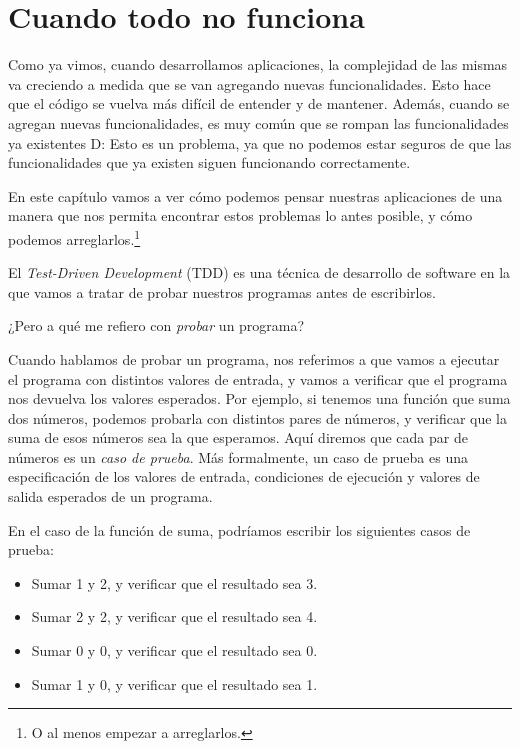 \chapter{Cuando todo no funciona}
  \label{chap:cuando-todo-no-funciona}

  Como ya vimos, cuando desarrollamos aplicaciones, la complejidad de las mismas va creciendo a 
  medida que se van agregando nuevas funcionalidades. 
  Esto hace que el código se vuelva más difícil de entender y de mantener. 
  Además, cuando se agregan nuevas funcionalidades, es muy común que se rompan las funcionalidades 
  ya existentes D: 
  Esto es un problema, ya que no podemos estar seguros de que las funcionalidades que ya existen 
  siguen funcionando correctamente.

  En este capítulo vamos a ver cómo podemos pensar nuestras aplicaciones de una manera que nos
  permita encontrar estos problemas lo antes posible, y cómo podemos arreglarlos.\footnote{
    O al menos empezar a arreglarlos.
  }

  El \textit{Test-Driven Development} (TDD) es una técnica de 
  desarrollo de software en la que vamos a tratar de probar nuestros programas antes de escribirlos.
  
  ¿Pero a qué me refiero con \textit{probar} un programa?

  Cuando hablamos de probar un programa, nos referimos a que vamos a ejecutar el programa con
  distintos valores de entrada, y vamos a verificar que el programa nos devuelva los valores
  esperados.
  Por ejemplo, si tenemos una función que suma dos números, podemos probarla con distintos pares
  de números, y verificar que la suma de esos números sea la que esperamos.
  Aquí diremos que cada par de números es un \textit{caso de prueba}.
  Más formalmente, un caso de prueba es una especificación de los valores de entrada, condiciones de
  ejecución y valores de salida esperados de un programa.

  En el caso de la función de suma, podríamos escribir los siguientes casos de prueba:

  \begin{itemize}
    \item Sumar 1 y 2, y verificar que el resultado sea 3.
    \item Sumar 2 y 2, y verificar que el resultado sea 4.
    \item Sumar 0 y 0, y verificar que el resultado sea 0.
    \item Sumar 1 y 0, y verificar que el resultado sea 1.
  \end{itemize}

